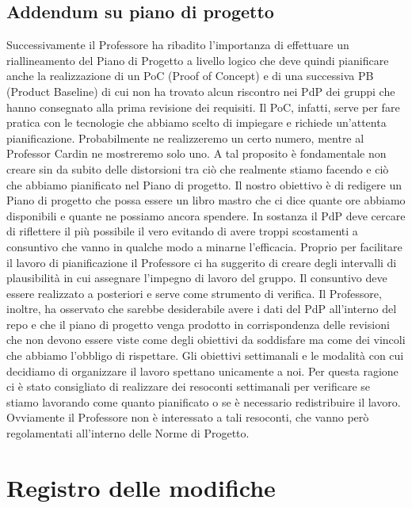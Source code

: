 \documentclass{article}
\begin{document}
\subsection{Addendum su piano di progetto}%
\label{sub:addendum_su_piano_di_progetto}

Successivamente il Professore ha ribadito l'importanza di effettuare un riallineamento del Piano di Progetto a livello logico che deve quindi pianificare anche la realizzazione di un PoC (Proof of Concept) e di una successiva PB (Product Baseline) di cui non ha trovato alcun riscontro nei PdP dei gruppi che hanno consegnato alla prima revisione dei requisiti.
Il PoC, infatti, serve per fare pratica con le tecnologie che abbiamo scelto di impiegare e richiede un'attenta pianificazione.
Probabilmente ne realizzeremo un certo numero, mentre al Professor Cardin ne mostreremo solo uno.
A tal proposito è fondamentale non creare sin da subito delle distorsioni tra ciò che realmente stiamo facendo e ciò che abbiamo pianificato nel Piano di progetto.
Il nostro obiettivo è di redigere un Piano di progetto che possa essere un libro mastro che ci dice quante ore abbiamo disponibili e quante ne possiamo ancora spendere.
In sostanza il PdP deve cercare di riflettere il più possibile il vero evitando di avere troppi scostamenti a consuntivo che vanno in qualche modo a minarne l'efficacia.
Proprio per facilitare il lavoro di pianificazione il Professore ci ha suggerito di creare degli intervalli di plausibilità in cui assegnare l'impegno di lavoro del gruppo.
Il consuntivo deve essere realizzato a posteriori e serve come strumento di verifica.
Il Professore, inoltre, ha osservato che sarebbe desiderabile avere i dati del PdP all'interno del repo e che il piano di progetto venga prodotto in corrispondenza delle revisioni che non devono essere viste come degli obiettivi da soddisfare ma come dei vincoli che abbiamo l'obbligo di rispettare.
Gli obiettivi settimanali e le modalità con cui decidiamo di organizzare il lavoro spettano unicamente a noi.
Per questa ragione ci è stato consigliato di realizzare dei resoconti settimanali per verificare se stiamo lavorando come quanto pianificato o se è necessario redistribuire il lavoro.
Ovviamente il Professore non è interessato a tali resoconti, che vanno però regolamentati all'interno delle Norme di Progetto.

\section{Registro delle modifiche}%
\label{sec:registro_modifiche}
\end{document}
